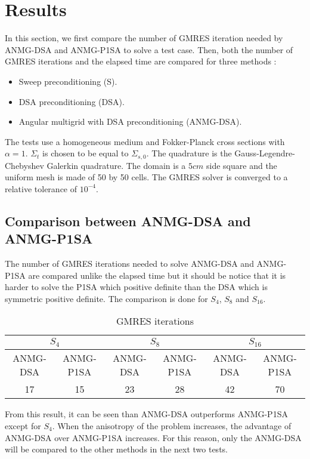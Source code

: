 \section{Results}
In this section, we first compare the number of GMRES iteration needed by 
ANMG-DSA and ANMG-P1SA to solve a test case. Then, both the number of GMRES 
iterations and the elapsed time are compared for three methods :
\begin{itemize}
\item Sweep preconditioning (S).
\item DSA preconditioning (DSA).
\item Angular multigrid with DSA preconditioning (ANMG-DSA).
\end{itemize}
The tests use a homogeneous medium and Fokker-Planck cross
sections with $\alpha=1$. $\Sigma_{t}$ is chosen to be equal to
$\Sigma_{s,0}$. The quadrature is the Gauss-Legendre-Chebyshev Galerkin
quadrature. The domain is a $5cm$ side square and the uniform mesh is made 
of 50 by 50 
cells. The GMRES solver is converged to a relative tolerance of $10^{-4}$.
\subsection{Comparison between ANMG-DSA and ANMG-P1SA}
The number of GMRES iterations needed to solve ANMG-DSA and
ANMG-P1SA are compared unlike the elapsed time but it should be notice that it is
harder to solve the P1SA which positive definite than the DSA which is
symmetric positive definite. The comparison is done for $S_4$, $S_8$ and
$S_{16}$. 
\begin{table}[H]
\begin{center}
\begin{tabular}{|c|c|c|c|c|c|}
\hline
\multicolumn{2}{|c|}{$S_4$} & \multicolumn{2}{c|}{$S_8$} &
\multicolumn{2}{c|}{$S_{16}$}\\
\hline
ANMG-DSA & ANMG-P1SA & ANMG-DSA & ANMG-P1SA & ANMG-DSA & ANMG-P1SA\\
\hline
17 &  15 & 23 & 28 & 42 & 70\\
\hline
\end{tabular}
\caption{GMRES iterations}
\end{center}
\end{table}
From this result, it can be seen than ANMG-DSA outperforms ANMG-P1SA except for
$S_4$. When the anisotropy of the problem increases, the advantage of ANMG-DSA
over ANMG-P1SA increases. For this reason, only the ANMG-DSA will be compared
to the other methods in the next two tests.
